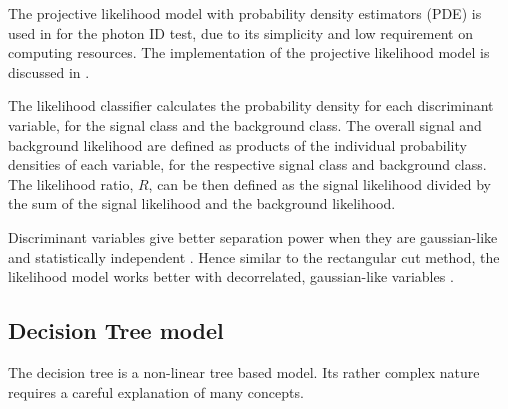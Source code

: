 The projective likelihood model with probability density estimators (PDE) is used in \pandora for the photon ID test,  due to its simplicity and low requirement on computing resources. The \pandora implementation of the projective likelihood model is discussed  in .

The likelihood classifier calculates the probability density for each discriminant variable, for the signal class and the  background class. The overall signal and background likelihood are defined as products of the individual probability densities of each variable, for the respective signal class and background class. The likelihood ratio, $R$, can be then defined as the signal likelihood divided by the sum of the signal likelihood and the background likelihood.


Discriminant variables give better separation power when they are gaussian-like and statistically independent \cite{hastie2009elements}. Hence similar to the rectangular cut method, the likelihood model works better with decorrelated, gaussian-like variables \cite{hastie2009elements}.



\subsection{Decision Tree model}
\label{sec:pandoraDecisionTree}


The decision tree is a non-linear tree based model. Its rather complex nature requires a careful explanation of many concepts.

